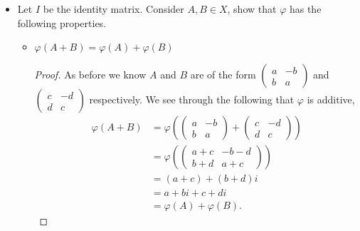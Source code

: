 \documentclass[11pt]{article}
\newenvironment{problem}[2][Problem\!]{\begin{trivlist}
\item[\hskip \labelsep {\bfseries #1}\hskip \labelsep {\bfseries #2.}]}{\end{trivlist}}
\newcommand{\lrp}[1]{\left(#1\right)}
\renewcommand{\phi}{\varphi}
\begin{document}
\begin{problem}{1.2}
\begin{itemize}
\item[(b)] Let $I$ be the identity matrix. Consider $A,B \in X$, show that $\phi$ has the following properties.
\begin{itemize}
\item[(i)] $\phi(A+B) = \phi(A)+\phi(B)$
\begin{example}
    \begin{proof}
        As before we know $A$ and $B$ are of the form $\begin{pmatrix}
            a & -b \\ b & a
        \end{pmatrix}$ and $\begin{pmatrix}
            c & -d \\ d & c
        \end{pmatrix}$ respectively. We see through the following that $\phi$ is additive,
        \begin{align*}
            \phi(A + B) &= \phi\lrp{\begin{pmatrix}
                a & -b \\ b & a
            \end{pmatrix} +\begin{pmatrix}
                c & -d \\ d & c
            \end{pmatrix}} \\
            &= \phi\lrp{\begin{pmatrix}
                a + c & -b - d \\ b + d & a + c
            \end{pmatrix}} \\
            &= (a+c) + (b+d)i \\
            &= a + bi + c + di \\
            &= \phi(A) + \phi(B).
        \end{align*}
    \end{proof}
\end{example} 


\end{itemize}
\end{itemize}
\end{problem}
\end{document}
